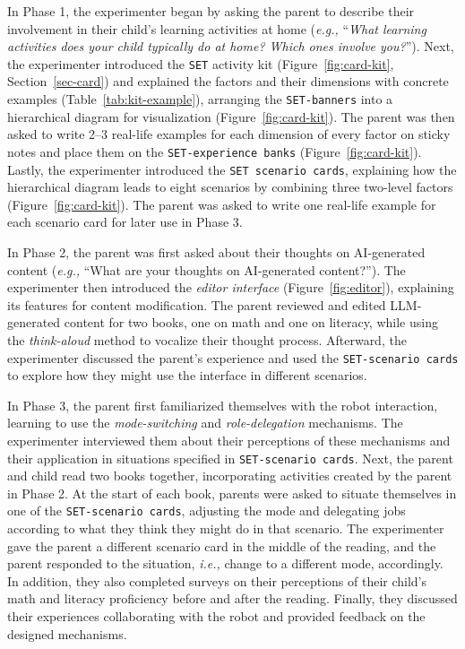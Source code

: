 In Phase 1, the experimenter began by asking the parent to describe their involvement in their child's learning activities at home (\textit{e.g.,} ``\textit{What learning activities does your child typically do at home? Which ones involve you?}''). Next, the experimenter introduced the \texttt{SET} activity kit (Figure~\ref{fig:card-kit}, Section~\ref{sec-card}) and explained the factors and their dimensions with concrete examples (Table~\ref{tab:kit-example}), arranging the \texttt{SET-banners} into a hierarchical diagram for visualization (Figure~\ref{fig:card-kit}). The parent was then asked to write 2–3 real-life examples for each dimension of every factor on sticky notes and place them on the \texttt{SET-experience banks} (Figure~\ref{fig:card-kit}). Lastly, the experimenter introduced the \texttt{SET scenario cards}, explaining how the hierarchical diagram leads to eight scenarios by combining three two-level factors (Figure~\ref{fig:card-kit}). The parent was asked to write one real-life example for each scenario card for later use in Phase 3.

In Phase 2, the parent was first asked about their thoughts on AI-generated content (\textit{e.g.,} ``What are your thoughts on AI-generated content?''). The experimenter then introduced the \textit{editor interface} (Figure~\ref{fig:editor}), explaining its features for content modification. The parent reviewed and edited LLM-generated content for two books, one on math and one on literacy, while using the \textit{think-aloud} method to vocalize their thought process. Afterward, the experimenter discussed the parent's experience and used the \texttt{SET-scenario cards} to explore how they might use the interface in different scenarios.

In Phase 3, the parent first familiarized themselves with the robot interaction, learning to use the \textit{mode-switching} and \textit{role-delegation} mechanisms. The experimenter interviewed them about their perceptions of these mechanisms and their application in situations specified in \texttt{SET-scenario cards}. Next, the parent and child read two books together, incorporating activities created by the parent in Phase 2. At the start of each book, parents were asked to situate themselves in one of the \texttt{SET-scenario cards}, adjusting the mode and delegating jobs according to what they think they might do in that scenario. The experimenter gave the parent a different scenario card in the middle of the reading, and the parent responded to the situation, \textit{i.e.,} change to a different mode, accordingly. In addition, they also completed surveys on their perceptions of their child's math and literacy proficiency before and after the reading. Finally, they discussed their experiences collaborating with the robot and provided feedback on the designed mechanisms.

